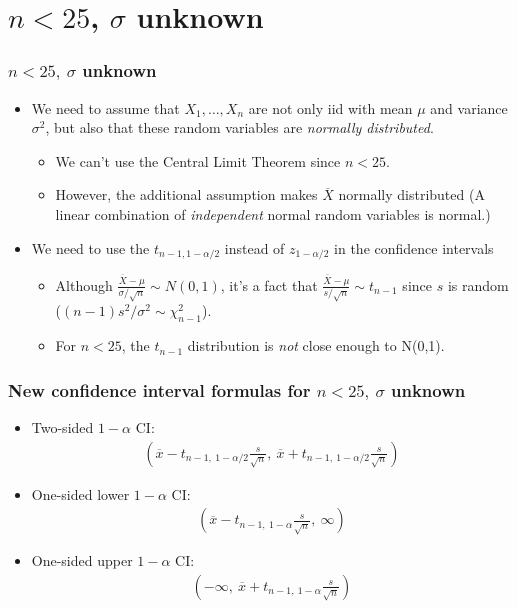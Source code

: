 \documentclass[handout]{beamer}\usepackage[]{graphicx}\usepackage[]{color}
\providecommand{\ov}[1]{\overline{#1}}
\numberwithin{equation}{section}
\begin{document}
\section{$n < 25$, $\sigma$ unknown}

\begin{frame}
\frametitle{$n < 25, \ \sigma$ unknown}
\begin{itemize}
\item We need to assume that $X_1, \ldots, X_n$ are not only iid with mean $\mu$ and variance $\sigma^2$, but also that these random variables are \emph{normally distributed}.
\begin{itemize}
\pause \item We can't use the Central Limit Theorem since $n < 25$. 
\pause \item However, the additional assumption makes $\ov{X}$ normally distributed (A linear combination of \emph{independent} normal random variables is normal.)
\end{itemize}
\pause \item We need to use the $t_{n - 1, 1 - \alpha/2}$ instead of $z_{1 - \alpha/2}$ in the confidence intervals
\begin{itemize}
\pause \item Although $\frac{\ov{X} - \mu}{\sigma/\sqrt{n}} \sim N(0,1)$, it's a fact that $\frac{\ov{X} - \mu}{s/\sqrt{n}} \sim t_{n - 1}$ since $s$ is random ($(n-1)s^2/\sigma^2 \sim \chi^2_{n-1}$).
\pause \item For $n < 25$, the $t_{n - 1}$ distribution is \emph{not} close enough to N(0,1).
\end{itemize}
\end{itemize}
\end{frame}


\begin{frame}
\frametitle{New confidence interval formulas for $n < 25, \ \sigma$ unknown}
\begin{itemize}
\item Two-sided $1 - \alpha$ CI:
\pause \begin{align*}
(\ov{x} - t_{n - 1, \ 1 - \alpha/2} \frac{s}{\sqrt{n}},\ \ov{x} + t_{n - 1, \ 1- \alpha/2 } \frac{s}{\sqrt{n}})
\end{align*} 
\pause \item One-sided lower $1 - \alpha$ CI:
\pause \begin{align*}
(\ov{x} - t_{n - 1, \ 1 - \alpha} \frac{s}{\sqrt{n}}, \ \infty)
\end{align*} 
\pause \item One-sided upper $1 - \alpha$ CI:
\pause \begin{align*}
(-\infty, \ \ov{x} + t_{n - 1, \ 1- \alpha } \frac{s}{\sqrt{n}})
\end{align*} 
\end{itemize}
\end{frame}
\end{document}
